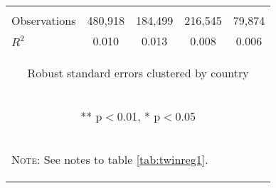 \documentclass{article}[11pt,subeqn]
\begin{document}
\begin{spacing}{1.5}
\begin{table}[htpb!]
\begin{center}
\begin{tabular}{lcccc}
\vspace{4pt} & \begin{footnotesize}\end{footnotesize} & \begin{footnotesize}\end{footnotesize} & \begin{footnotesize}\end{footnotesize} & \begin{footnotesize}\end{footnotesize} \\
Observations & 480,918 & 184,499 & 216,545 & 79,874 \\
 $R^2$ & 0.010 & 0.013 & 0.008 & 0.006 \\ \midrule
\multicolumn{5}{c}{\begin{footnotesize} Robust standard errors clustered by country \end{footnotesize}} \\
\multicolumn{5}{c}{\begin{footnotesize} ** p$<$0.01, * p$<$0.05 \end{footnotesize}} \\
\bottomrule
\multicolumn{5}{p{8cm}}{\setstretch{0.9}\begin{footnotesize}\textsc{Note:} See notes to table \ref{tab:twinreg1}.\end{footnotesize}}\\
\end{tabular}
\end{center}
\end{table}





\end{spacing}
\end{document}

